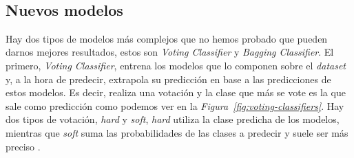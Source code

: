 \begin{table}[!ht]
    \centering
    \caption{Resultados de entrenar los modelos básicos habiendo balanceado el \textit{dataset}. Fuente propia.}\ \label{tab:balanced-basic-training}
\end{table}

\clearpage
\subsection{Nuevos modelos}

Hay dos tipos de modelos más complejos que no hemos probado que pueden darnos mejores resultados, estos son \textit{Voting Classifier} y \textit{Bagging Classifier}. El primero, \textit{Voting Classifier}, entrena los modelos que lo componen sobre el \textit{dataset} y, a la hora de predecir, extrapola su predicción en base a las predicciones de estos modelos. Es decir, realiza una votación y la clase que más se vote es la que sale como predicción como podemos ver en la \textit{Figura\ \ref{fig:voting-classifiers}}. Hay dos tipos de votación, \textit{hard} y \textit{soft}, \textit{hard} utiliza la clase predicha de los modelos, mientras que \textit{soft} suma las probabilidades de las clases a predecir y suele ser más preciso \cite{Ensemble96:online}. 

